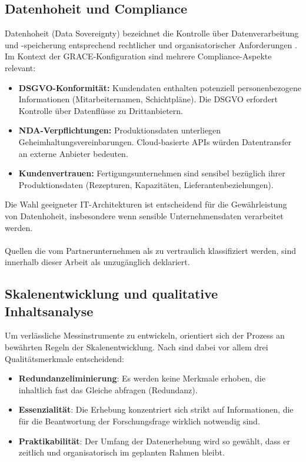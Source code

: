 \subsection{Datenhoheit und Compliance}
\label{subsec:Datenhoheit}


Datenhoheit (Data Sovereignty) bezeichnet die Kontrolle über Datenverarbeitung und -speicherung entsprechend rechtlicher und organisatorischer Anforderungen \citep{hummel:data_sovereignty2021}. Im Kontext der GRACE-Konfiguration sind mehrere Compliance-Aspekte relevant:

\begin{itemize}
    \item \textbf{DSGVO-Konformität:} Kundendaten enthalten potenziell personenbezogene Informationen (Mitarbeiternamen, Schichtpläne). Die DSGVO \citep{dsgvo2018} erfordert Kontrolle über Datenflüsse zu Drittanbietern.
    \item \textbf{NDA-Verpflichtungen:} Produktionsdaten unterliegen Geheimhaltungsvereinbarungen. Cloud-basierte APIs würden Datentransfer an externe Anbieter bedeuten.
    \item \textbf{Kundenvertrauen:} Fertigungsunternehmen sind sensibel bezüglich ihrer Produktionsdaten (Rezepturen, Kapazitäten, Lieferantenbeziehungen).
\end{itemize}

Die Wahl geeigneter IT-Architekturen ist entscheidend für die Gewährleistung von Datenhoheit, insbesondere wenn sensible Unternehmensdaten verarbeitet werden. \\\\Quellen die vom Partnerunternehmen als zu vertraulich klassifiziert werden, sind innerhalb dieser Arbeit als unzugänglich deklariert. 

\subsection{Skalenentwicklung und qualitative Inhaltsanalyse}

Um verlässliche Messinstrumente zu entwickeln, orientiert sich der Prozess an bewährten Regeln der Skalenentwicklung. Nach \cite{devellis:scale_development2017} sind dabei vor allem drei Qualitätsmerkmale entscheidend:

\begin{itemize}
    \item \textbf{Redundanzeliminierung}: Es werden keine Merkmale erhoben, die inhaltlich fast das Gleiche abfragen (Redundanz).
    \item \textbf{Essenzialität}: Die Erhebung konzentriert sich strikt auf Informationen, die für die Beantwortung der Forschungsfrage wirklich notwendig sind.
    \item \textbf{Praktikabilität}: Der Umfang der Datenerhebung wird so gewählt, dass er zeitlich und organisatorisch im geplanten Rahmen bleibt.
\end{itemize}

